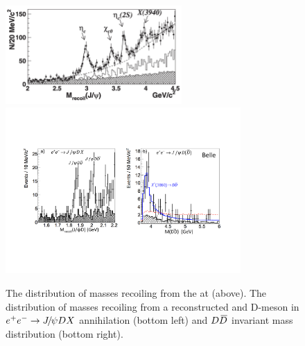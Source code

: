 \begin{figure}[!hbtp]
\centering
   \includegraphics[width=0.6\textwidth]{Figures/01_Introduction/Exotic/neutral_particle/X3940} \\%
   \includegraphics[width=0.8\textwidth]{Figures/01_Introduction/Exotic/neutral_particle/belle_x3860} %
   \caption{ The distribution of masses recoiling from the \jpsi at \belle\supercite{PhysRevLett.98.082001} (above).
   The distribution of masses recoiling from a reconstructed \jpsi and D-meson in ${e^+}{e^-}\rightarrow{\ensuremath{{J\mskip -3mu/\mskip -2mu\psi}}}{\ensuremath{D}} X$ annihilation (bottom left) 
   and ${D}{\kern 0.18em\overline{\kern -0.18em D}}$ invariant mass distribution (bottom right)\supercite{PhysRevLett.100.202001}. }
\label{fig:X3940}
\end{figure}

